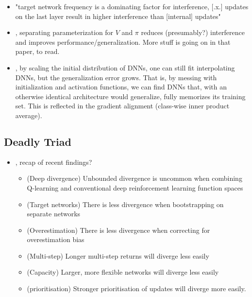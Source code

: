 \begin{itemize}
    \item \citet{liu2020practical} "target network frequency is a dominating factor for interference, [.x.] updates on the last layer result in higher interference than [internal] updates"
    \item \citet{cobbe2020phasic}, separating parameterization for $V$ and $\pi$ reduces (presumably?) interference and improves performance/generalization. More stuff is going on in that paper, to read.
    \item \citet{mehta2020extreme}, by scaling the initial distribution of DNNs, one can still fit interpolating DNNs, but the generalization error grows. That is, by messing with initialization and activation functions, we can find DNNs that, with an otherwise identical architecture would generalize, fully memorizes its training set. This is reflected in the gradient alignment (class-wise inner product average).
\end{itemize}

\subsection{Deadly Triad}
\begin{itemize}
    \item \cite{hasselt2018deep}, recap of recent findings?
    \begin{itemize}
        \item (Deep divergence) Unbounded divergence is uncommon when combining Q-learning and conventional deep reinforcement learning function spaces
        \item (Target networks) There is less divergence when bootstrapping on separate networks
        \item (Overestimation) There is less divergence when correcting for overestimation bias
        \item (Multi-step) Longer multi-step returns will diverge less easily
        \item (Capacity) Larger, more flexible networks will diverge less easily
        \item (prioritisation) Stronger prioritisation of updates will diverge more easily.
    \end{itemize}
\end{itemize}

